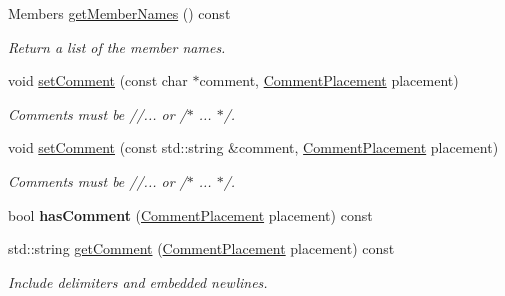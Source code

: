 \begin{DoxyCompactItemize}
Members \mbox{\hyperlink{class_json_1_1_value_a5fa4e5279e83a421f9c128dd78be652b}{get\+Member\+Names}} () const
\begin{DoxyCompactList}\small\item\em Return a list of the member names. \end{DoxyCompactList}\item 
\mbox{\label{class_json_1_1_value_a29f3a30f7e5d3af6f38d57999bf5b480}} 
void \mbox{\hyperlink{class_json_1_1_value_a29f3a30f7e5d3af6f38d57999bf5b480}{set\+Comment}} (const char $\ast$comment, \mbox{\hyperlink{namespace_json_a4fc417c23905b2ae9e2c47d197a45351}{Comment\+Placement}} placement)
\begin{DoxyCompactList}\small\item\em Comments must be //... or /$\ast$ ... $\ast$/. \end{DoxyCompactList}\item 
\mbox{\label{class_json_1_1_value_a6d68a2e7d4e1e317cd9e812e12181689}} 
void \mbox{\hyperlink{class_json_1_1_value_a6d68a2e7d4e1e317cd9e812e12181689}{set\+Comment}} (const std\+::string \&comment, \mbox{\hyperlink{namespace_json_a4fc417c23905b2ae9e2c47d197a45351}{Comment\+Placement}} placement)
\begin{DoxyCompactList}\small\item\em Comments must be //... or /$\ast$ ... $\ast$/. \end{DoxyCompactList}\item 
\mbox{\label{class_json_1_1_value_a65d8e3ab6a5871cbd019a3e0f0b944a3}} 
bool {\bfseries has\+Comment} (\mbox{\hyperlink{namespace_json_a4fc417c23905b2ae9e2c47d197a45351}{Comment\+Placement}} placement) const
\item 
\mbox{\label{class_json_1_1_value_a8fc2d59502fbb4fbb3b641b07ec0e069}} 
std\+::string \mbox{\hyperlink{class_json_1_1_value_a8fc2d59502fbb4fbb3b641b07ec0e069}{get\+Comment}} (\mbox{\hyperlink{namespace_json_a4fc417c23905b2ae9e2c47d197a45351}{Comment\+Placement}} placement) const
\begin{DoxyCompactList}\small\item\em Include delimiters and embedded newlines. \end{DoxyCompactList}\item 
\mbox{\label{class_json_1_1_value_a3696d34c1a1833742b4bf8e5b247f125}} 

\end{DoxyCompactItemize}
